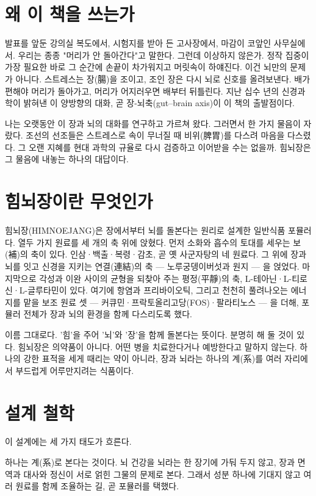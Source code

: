 \documentclass[12pt,oneside]{book}
\begin{document}
\section{왜 이 책을 쓰는가}

발표를 앞둔 강의실 복도에서, 시험지를 받아 든 고사장에서, 마감이 코앞인 사무실에서. 우리는 종종 "머리가 안 돌아간다"고 말한다. 그런데 이상하지 않은가. 정작 집중이 가장 필요한 바로 그 순간에 손끝이 차가워지고 머릿속이 하얘진다. 이건 뇌만의 문제가 아니다. 스트레스는 장(腸)을 조이고, 조인 장은 다시 뇌로 신호를 올려보낸다. 배가 편해야 머리가 돌아가고, 머리가 어지러우면 배부터 뒤틀린다. 지난 십수 년의 신경과학이 밝혀낸 이 양방향의 대화, 곧 장-뇌축(gut–brain axis)이 이 책의 출발점이다.

나는 오랫동안 이 장과 뇌의 대화를 연구하고 가르쳐 왔다. 그러면서 한 가지 물음이 자랐다. 조선의 선조들은 스트레스로 속이 무너질 때 비위(脾胃)를 다스려 마음을 다스렸다. 그 오랜 지혜를 현대 과학의 규율로 다시 검증하고 이어받을 수는 없을까. 힘뇌장은 그 물음에 내놓는 하나의 대답이다.

\section{힘뇌장이란 무엇인가}

힘뇌장(HIMNOEJANG)은 장에서부터 뇌를 돌본다는 원리로 설계한 일반식품 포뮬러다. 열두 가지 원료를 세 개의 축 위에 앉혔다. 먼저 소화와 흡수의 토대를 세우는 보(補)의 축이 있다. 인삼·백출·복령·감초, 곧 옛 사군자탕의 네 원료다. 그 위에 장과 뇌를 잇고 신경을 지키는 연결(連結)의 축 — 노루궁뎅이버섯과 원지 — 을 얹었다. 마지막으로 각성과 이완 사이의 균형을 되찾아 주는 평정(平靜)의 축, L-테아닌·L-티로신·L-글루타민이 있다. 여기에 항염과 프리바이오틱, 그리고 천천히 풀려나오는 에너지를 맡을 보조 원료 셋 — 커큐민·프락토올리고당(FOS)·팔라티노스 — 을 더해, 포뮬러 전체가 장과 뇌의 환경을 함께 다스리도록 했다.

이름 그대로다. '힘'을 주어 '뇌'와 '장'을 함께 돌본다는 뜻이다. 분명히 해 둘 것이 있다. 힘뇌장은 의약품이 아니다. 어떤 병을 치료한다거나 예방한다고 말하지 않는다. 하나의 강한 표적을 세게 때리는 약이 아니라, 장과 뇌라는 하나의 계(系)를 여러 자리에서 부드럽게 어루만지려는 식품이다.

\section{설계 철학}

이 설계에는 세 가지 태도가 흐른다.

하나는 계(系)로 본다는 것이다. 뇌 건강을 뇌라는 한 장기에 가둬 두지 않고, 장과 면역과 대사와 정신이 서로 얽힌 그물의 문제로 본다. 그래서 성분 하나에 기대지 않고 여러 원료를 함께 조율하는 길, 곧 포뮬러를 택했다.
\end{document}
